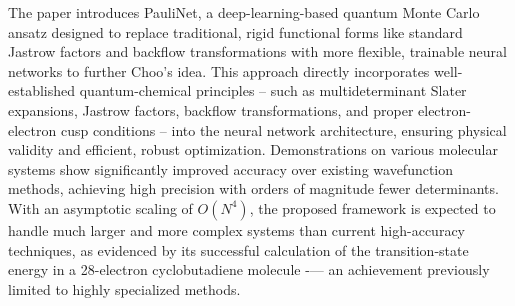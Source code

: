 The paper introduces PauliNet, a deep-learning-based quantum Monte Carlo ansatz designed to replace traditional, rigid functional forms like standard Jastrow factors and backflow transformations with more flexible, trainable neural networks to further Choo's idea. This approach directly incorporates well-established quantum-chemical principles -- such as multideterminant Slater expansions, Jastrow factors, backflow transformations, and proper electron-electron cusp conditions -- into the neural network architecture, ensuring physical validity and efficient, robust optimization. Demonstrations on various molecular systems show significantly improved accuracy over existing wavefunction methods, achieving high precision with orders of magnitude fewer determinants. With an asymptotic scaling of $O(N^4)$, the proposed framework is expected to handle much larger and more complex systems than current high-accuracy techniques, as evidenced by its successful calculation of the transition-state energy in a 28-electron cyclobutadiene molecule -— an achievement previously limited to highly specialized methods\cite{hermann_deep-neural-network_2020}.